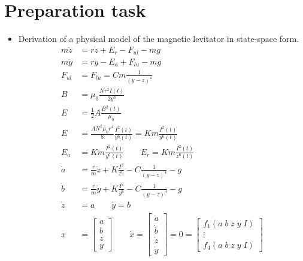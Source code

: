 \documentclass[10pt,a4paper]{article}
\begin{document}
\begin{titlepage}

\end{titlepage}
\newpage
\pagestyle{plain}

\section{Preparation task}
\begin{itemize}
    \item Derivation of a physical model of the magnetic levitator in state-space form.
	\begin{align*}
		m \ddot{z} &= r \dot{z} + E_{r} - F_{ul} - mg \\
		m \ddot{y} &= r \dot{y} - E_{a} + F_{lu} - mg \\
		F_{ul} &= F_{lu} = C m \frac{1}{(y - z)^{4}} \\
		B &= \mu_{0} \frac{N r^{2} I(t)}{2 y^{3}} \\
		E &= \frac{1}{2} A \frac{B^{2}(t)}{\mu_{0}} \\
		E &= \frac{A N^{2} \mu_{0} r^{4}}{8} \frac{I^{2}(t)}{y^{6}(t)} = K m \frac{I^{2}(t)}{y^{6}(t)} \\
		E_{a} &= K m \frac{I^{2}(t)}{y^{6}(t)} \qquad E_{r} = K m \frac{I^{2}(t)}{z^{6}(t)} \\
		\dot{a} &= \frac{r}{m} \dot{z} + K \frac{I^{2}}{z^{6}} - C \frac{1}{(y - z)^{4}} - g \\
		\dot{b} &= \frac{r}{m} \dot{y} + K \frac{I^{2}}{y^{6}} - C \frac{1}{(y - z)^{4}} - g \\
		\dot{z} &= a \qquad \dot{y} = b \\
		x &= \begin{bmatrix} a \\ b \\ z \\ y \end{bmatrix} \qquad \dot{x} = \begin{bmatrix} \dot{a} \\ \dot{b} \\ \dot{z} \\ \dot{y} \end{bmatrix} = 0 = \begin{bmatrix} f_{1}(a \; b \; z \; y \; I) \\ \vdots \\ f_{4}(a \; b \; z \; y \; I) \end{bmatrix} \\

\end{align*}
\end{itemize}
\end{document}
